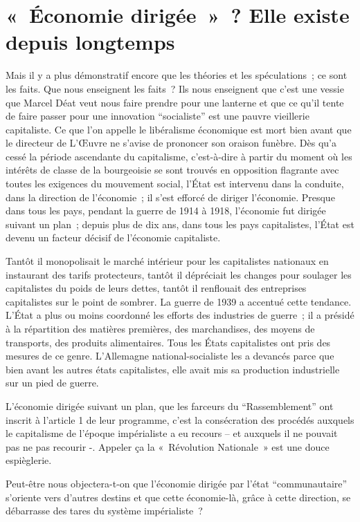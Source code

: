 \documentclass[french,twoside]{book} %
\begin{document}
\section[« Économie dirigée » ? Elle existe depuis longtemps]{« Économie dirigée » ? Elle existe depuis longtemps}
\noindent Mais il y a plus démonstratif encore que les théories et les spéculations ; ce sont les faits. Que nous enseignent les faits ? Ils nous enseignent que c’est une vessie que Marcel Déat veut nous faire prendre pour une lanterne et que ce qu’il tente de faire passer pour une innovation “socialiste” est une pauvre vieillerie capitaliste. Ce que l’on appelle le libéralisme économique est mort bien avant que le directeur de L’Œuvre ne s’avise de prononcer son oraison funèbre. Dès qu’a cessé la période ascendante du capitalisme, c’est-à-dire à partir du moment où les intérêts de classe de la bourgeoisie se sont trouvés en opposition flagrante avec toutes les exigences du mouvement social, l’État est intervenu dans la conduite, dans la direction de l’économie ; il s’est efforcé de diriger l’économie. Presque dans tous les pays, pendant la guerre de 1914 à 1918, l’économie fut dirigée suivant un plan ; depuis plus de dix ans, dans tous les pays capitalistes, l’État est devenu un facteur décisif de l’économie capitaliste.\par
Tantôt il monopolisait le marché intérieur pour les capitalistes nationaux en instaurant des tarifs protecteurs, tantôt il dépréciait les changes pour soulager les capitalistes du poids de leurs dettes, tantôt il renflouait des entreprises capitalistes sur le point de sombrer. La guerre de 1939 a accentué cette tendance. L’État a plus ou moins coordonné les efforts des industries de guerre ; il a présidé à la répartition des matières premières, des marchandises, des moyens de transports, des produits alimentaires. Tous les États capitalistes ont pris des mesures de ce genre. L’Allemagne national-socialiste les a devancés parce que bien avant les autres états capitalistes, elle avait mis sa production industrielle sur un pied de guerre.\par
L’économie dirigée suivant un plan, que les farceurs du “Rassemblement” ont inscrit à l’article 1 de leur programme, c’est la consécration des procédés auxquels le capitalisme de l’époque impérialiste a eu recours – et auxquels il ne pouvait pas ne pas recourir -. Appeler ça la « Révolution Nationale » est une douce espièglerie.\par
Peut-être nous objectera-t-on que l’économie dirigée par l’état “communautaire” s’oriente vers d’autres destins et que cette économie-là, grâce à cette direction, se débarrasse des tares du système impérialiste ?\par
\end{document}
